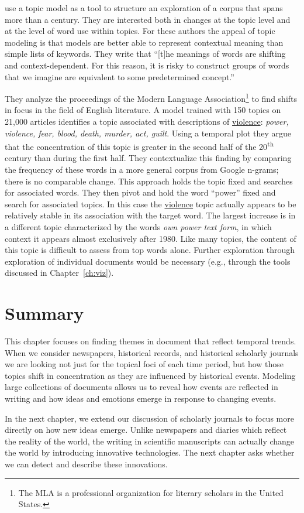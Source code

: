 \citet{Goldstone-14} use a topic model as a tool to structure an exploration of a corpus that spans more than a century.
They are interested both in changes at the topic level and at the level of word use within topics.
For these authors the appeal of topic modeling is that models are better able to represent contextual meaning than simple lists of keywords. They write that ``[t]he meanings
of words are shifting and context-dependent. For this reason, it is risky to
construct groups of words that we imagine are equivalent to some predetermined
concept.''

They analyze the proceedings of the Modern Language Association\footnote{The MLA is a professional organization for literary scholars in the United States.} to find shifts in focus in the field of English literature.
A model trained with 150 topics on 21,000 articles identifies a topic associated with descriptions of \underline{violence}: {\em power,
violence, fear, blood, death, murder, act, guilt}. Using a temporal plot they argue that the concentration of this topic is greater in the second half of the 20\textsuperscript{th} century than during the first half.
They contextualize this finding by comparing the frequency of these words in a more general corpus from Google n-grams; there is no comparable change.
This approach holds the topic fixed and searches for associated words.
They then pivot and hold the word ``power'' fixed and search for associated topics.
In this case the \underline{violence} topic actually appears to be relatively stable in its association with the target word. The largest increase is in a different topic characterized by the words {\em own power text form}, in which context it appears almost exclusively after 1980.
Like many topics, the content of this topic is difficult to assess from top words alone.
Further exploration through exploration of individual documents would be necessary (e.g., through the tools discussed in Chapter~\ref{ch:viz}).

\section{Summary}

This chapter focuses on finding themes in document that reflect temporal trends.
When we consider newspapers, historical records, and historical scholarly journals we are looking not just for the topical foci of each time period, but how those topics shift in concentration as they are influenced by historical events.
Modeling large collections of documents allows us to reveal how events are reflected in writing and how ideas and emotions emerge in response to changing events.

In the next chapter, we extend our discussion of scholarly journals to focus more directly on how new ideas emerge.
Unlike newspapers and diaries which reflect the reality of the world, the writing in scientific manuscripts can actually change the world by introducing innovative technologies.
The next chapter asks whether we can detect and describe these innovations.
